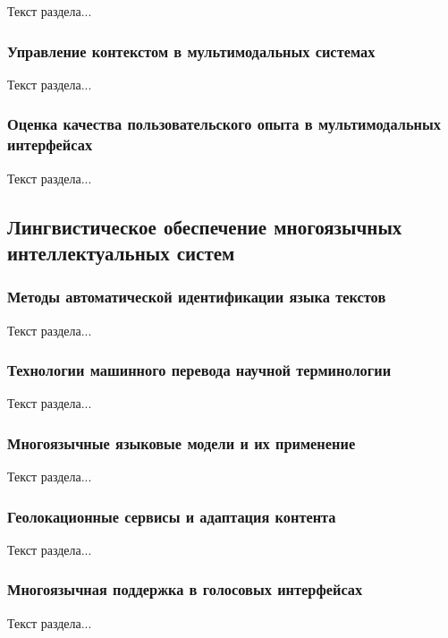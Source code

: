 Текст раздела...

\subsubsection{Управление контекстом в мультимодальных системах}

Текст раздела...

\subsubsection{Оценка качества пользовательского опыта в мультимодальных интерфейсах}

Текст раздела...

\subsection{Лингвистическое обеспечение многоязычных интеллектуальных систем}

\subsubsection{Методы автоматической идентификации языка текстов}

Текст раздела...

\subsubsection{Технологии машинного перевода научной терминологии}

Текст раздела...

\subsubsection{Многоязычные языковые модели и их применение}

Текст раздела...

\subsubsection{Геолокационные сервисы и адаптация контента}

Текст раздела...

\subsubsection{Многоязычная поддержка в голосовых интерфейсах}

Текст раздела...

